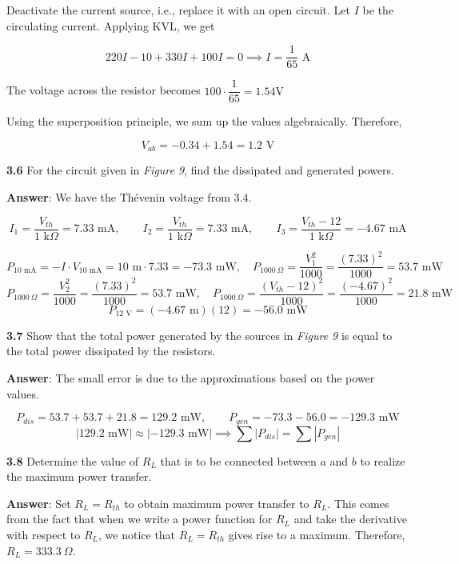 \documentclass{article}
\begin{document}
Deactivate the current source, i.e., replace it with an open circuit. Let $I$ be the circulating current. Applying KVL, we get

\[220I-10+330I+100I=0\implies I=\frac1{65}\text{ A}\]

The voltage across the resistor becomes $100\cdot\dfrac1{65}=1.54 \text{V}$

Using the superposition principle, we sum up the values algebraically. Therefore,

\[\boxed{V_{ab}=-0.34+1.54=1.2\text{ V}}\]

\textbf{3.6} For the circuit given in \textit{Figure 9}, find the dissipated and generated powers.

\textbf{Answer}: We have the Thévenin voltage from $3.4$.

\[I_1=\frac{V_{th}}{1\text{ k}\Omega}=7.33\text{ mA},\qquad I_2=\frac{V_{th}}{1\text{ k}\Omega}=7.33\text{ mA},\qquad I_3=\frac{V_{th}-12}{1\text{ k}\Omega}=-4.67\text{ mA}\]

\[\boxed{P_{10 \text{ mA}}=-I\cdot V_{10\text{ mA}}=10\text{ m}\cdot7.33=-73.3\text{ mW},\quad P_{1000\:\Omega}=\frac{V^2_1}{1000}=\frac{(7.33)^2}{1000}=53.7\text{ mW}}\]
\[\boxed{P_{1000\:\Omega}=\frac{V^2_2}{1000}=\frac{(7.33)^2}{1000}=53.7\text{ mW},\quad P_{1000\:\Omega}=\frac{(V_{th}-12)^2}{1000}=\frac{(-4.67)^2}{1000}=21.8\text{ mW}}\]
\[\boxed{P_{12\text{ V}}=(-4.67 \text{ m})(12)=-56.0\text{ mW}}\]

\textbf{3.7} Show that the total power generated by the sources in \textit{Figure 9} is equal to the total 
power dissipated by the resistors. 

\textbf{Answer}: The small error is due to the approximations based on the power values.

\[P_{dis}=53.7+53.7+21.8=129.2 \text{ mW},\qquad P_{gen}=-73.3-56.0=-129.3 \text{ mW}\]
\[|129.2\text{ mW}|\approx|{-129.3\text{ mW}}|\implies\sum|P_{dis}|=\sum|P_{gen}|\]

\textbf{3.8} Determine the value of $R_L$ that is to be connected between $a$ and $b$ to realize the maximum power transfer.

\textbf{Answer}: Set $R_L = R_{th}$ to obtain maximum power transfer to $R_L$. This comes from the fact that when we write a power function for $R_L$ and take the derivative with respect to $R_L$, we notice that $R_L=R_{th}$ gives rise to a maximum. Therefore, $\boxed{R_L=333.3\:\Omega}$.
\end{document}
